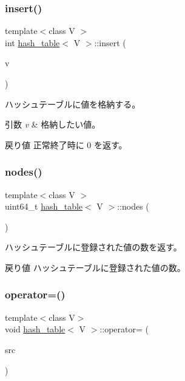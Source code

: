 \subsubsection{\texorpdfstring{insert()}{insert()}}
{\footnotesize\ttfamily template$<$class V $>$ \\
int \hyperlink{classhash__table}{hash\+\_\+table}$<$ V $>$\+::insert (\begin{DoxyParamCaption}\item[{V \&}]{v }\end{DoxyParamCaption})}

ハッシュテーブルに値を格納する。 
\begin{DoxyParams}{引数}
{\em v} & 格納したい値。 \\
\hline
\end{DoxyParams}
\begin{DoxyReturn}{戻り値}
正常終了時に 0 を返す。 
\end{DoxyReturn}
\hypertarget{classhash__table_accb6f8935ae8965655975426140d9447}{}\label{classhash__table_accb6f8935ae8965655975426140d9447} 
\subsubsection{\texorpdfstring{nodes()}{nodes()}}
{\footnotesize\ttfamily template$<$class V $>$ \\
uint64\+\_\+t \hyperlink{classhash__table}{hash\+\_\+table}$<$ V $>$\+::nodes (\begin{DoxyParamCaption}{ }\end{DoxyParamCaption})}

ハッシュテーブルに登録された値の数を返す。 \begin{DoxyReturn}{戻り値}
ハッシュテーブルに登録された値の数。 
\end{DoxyReturn}
\hypertarget{classhash__table_a22982acf5d5ba36d8ed199b2f6b25bd0}{}\label{classhash__table_a22982acf5d5ba36d8ed199b2f6b25bd0} 
\subsubsection{\texorpdfstring{operator=()}{operator=()}\hspace{0.1cm}{\footnotesize\ttfamily [1/2]}}
{\footnotesize\ttfamily template$<$class V$>$ \\
void \hyperlink{classhash__table}{hash\+\_\+table}$<$ V $>$\+::operator= (\begin{DoxyParamCaption}\item[{const \hyperlink{classhash__table}{hash\+\_\+table}$<$ V $>$ \&}]{src }\end{DoxyParamCaption})\hspace{0.3cm}{\ttfamily [delete]}}

